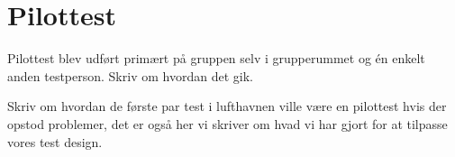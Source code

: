 \section{Pilottest}
\label{ParametrePilottest}
%
Pilottest blev udført primært på gruppen selv i grupperummet og én enkelt anden testperson. Skriv om hvordan det gik. 

Skriv om hvordan de første par test i lufthavnen ville være en pilottest hvis der opstod problemer, det er også her vi skriver om hvad vi har gjort for at tilpasse vores test design. 